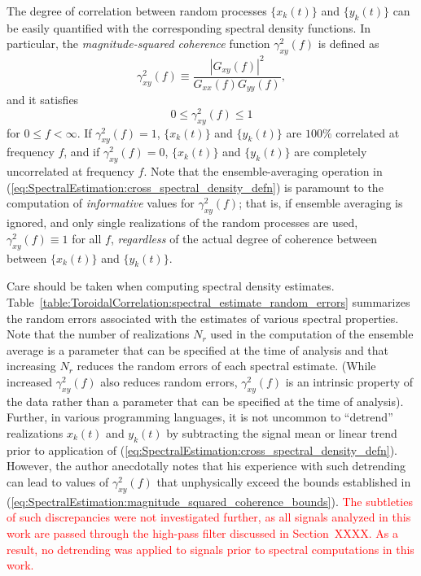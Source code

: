 The degree of correlation between random processes
$\{x_k(t)\}$ and $\{y_k(t)\}$ can be easily quantified
with the corresponding spectral density functions.
In particular, the \emph{magnitude-squared coherence} function
$\gamma_{xy}^2(f)$ is defined as
\begin{equation}
  \gamma_{xy}^2(f)
  \equiv
  \frac{|G_{xy}(f)|^2}{G_{xx}(f) G_{yy}(f)},
  \label{eq:SpectralEstimation:magnitude_squared_coherence_defn}
\end{equation}
and it satisfies
\begin{equation}
  0 \leq \gamma_{xy}^2(f) \leq 1
  \label{eq:SpectralEstimation:magnitude_squared_coherence_bounds}
\end{equation}
for $0 \leq f < \infty$.
If $\gamma_{xy}^2(f) = 1$,
$\{x_k(t)\}$ and $\{y_k(t)\}$ are $100\%$ correlated at frequency $f$, and
if $\gamma_{xy}^2(f) = 0$,
$\{x_k(t)\}$ and $\{y_k(t)\}$ are completely uncorrelated at frequency $f$.
Note that the ensemble-averaging operation in
(\ref{eq:SpectralEstimation:cross_spectral_density_defn})
is paramount to the computation
of \emph{informative} values for $\gamma_{xy}^2(f)$;
that is, if ensemble averaging is ignored, and
only single realizations of the random processes are used,
$\gamma_{xy}^2(f) \equiv 1$ for all $f$,
\emph{regardless} of the actual degree of coherence
between between $\{x_k(t)\}$ and $\{y_k(t)\}$.

Care should be taken when computing spectral density estimates.
Table~\ref{table:ToroidalCorrelation:spectral_estimate_random_errors}
summarizes the random errors associated with the estimates
of various spectral properties.
Note that the number of realizations $N_r$ used
in the computation of the ensemble average
is a parameter that can be specified
at the time of analysis and that
increasing $N_r$ reduces the random errors of each spectral estimate.
(While increased $\gamma_{xy}^2(f)$ also reduces random errors,
$\gamma_{xy}^2(f)$ is an intrinsic property of the data
rather than a parameter that can be specified at the time of analysis).
Further, in various programming languages,
it is not uncommon to ``detrend'' realizations $x_k(t)$ and $y_k(t)$
by subtracting the signal mean or linear trend
prior to application of
(\ref{eq:SpectralEstimation:cross_spectral_density_defn}).
However, the author anecdotally notes that his experience with
such detrending can lead to values of $\gamma_{xy}^2(f)$
that unphysically exceed the bounds established in
(\ref{eq:SpectralEstimation:magnitude_squared_coherence_bounds}).
\textcolor{red}{%
The subtleties of such discrepancies were not investigated further,
as all signals analyzed in this work
are passed through the high-pass filter
discussed in Section~XXXX.
As a result, no detrending was applied to signals
prior to spectral computations in this work.}

